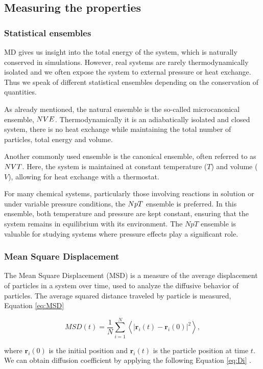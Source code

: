 \subsection{Measuring the properties}
\subsubsection{Statistical ensembles}
MD gives us insight into the total energy of the system, which is naturally conserved in simulations. However, real systems are rarely thermodynamically isolated and we often expose the system to external pressure or heat exchange. Thus we speak of different statistical ensembles depending on the conservation of quantities.

As already mentioned, the natural ensemble is the so-called microcanonical ensemble, $\boldmath{NVE}$. Thermodynamically it is an adiabatically isolated and closed system, there is no heat exchange while maintaining the total number of particles, total energy and volume. 

Another commonly used ensemble is the canonical ensemble, often referred to as $\boldmath{NVT}$. Here, the system is maintained at constant temperature ($T$) and volume ($V$), allowing for heat exchange with a thermostat.

For many chemical systems, particularly those involving reactions in solution or under variable pressure conditions, the $\boldmath{NpT}$ ensemble is preferred. In this ensemble, both temperature and pressure are kept constant, ensuring that the system remains in equilibrium with its environment. The $NpT$ ensemble is valuable for studying systems where pressure effects play a significant role.


\subsubsection{Mean Square Displacement}
The Mean Square Displacement (MSD) is a measure of the average displacement of particles in a system over time, used to analyze the diffusive behavior of particles. The average squared distance traveled by particle is measured, Equation \ref{eq:MSD}

\begin{equation}\label{eq:MSD}
MSD(t) = \frac{1}{N} \sum_{i=1}^{N} \left\langle \left| \mathbf{r}_i(t) - \mathbf{r}_i(0) \right|^2 \right\rangle,
\end{equation}

where $\mathbf{r}_i(0)$ is the initial position and $\mathbf{r}_i(t)$ is the particle position at time $t$. We can obtain diffusion coefficient by applying the following Equation \ref{eq:Di} \cite{braun_best_2019}. 

